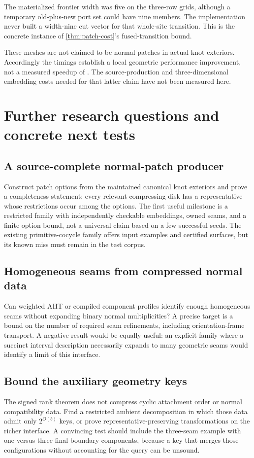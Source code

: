 \documentclass[11pt,letterpaper]{article}
\theoremstyle{definition}
\begin{document}
The materialized frontier width was five on the three-row grids, although a temporary old-plus-new port set could have nine members. The implementation never built a width-nine cut vector for that whole-site transition. This is the concrete instance of \cref{thm:patch-cost}'s fused-transition bound.

These meshes are not claimed to be normal patches in actual knot exteriors. Accordingly the timings establish a local geometric performance improvement, not a measured speedup of . The source-production and three-dimensional embedding costs needed for that latter claim have not been measured here.

\section{Further research questions and concrete next tests}
\label{sec:future}

\subsection{A source-complete normal-patch producer}
Construct patch options from the maintained canonical knot exteriors and prove a completeness statement: every relevant compressing disk has a representative whose restrictions occur among the options. The first useful milestone is a restricted family with independently checkable embeddings, owned seams, and a finite option bound, not a universal claim based on a few successful seeds. The existing primitive-cocycle family offers input examples and certified surfaces, but its known miss must remain in the test corpus.

\subsection{Homogeneous seams from compressed normal data}
Can weighted AHT or compiled component profiles identify enough homogeneous seams without expanding binary normal multiplicities? A precise target is a bound on the number of required seam refinements, including orientation-frame transport. A negative result would be equally useful: an explicit family where a succinct interval description necessarily expands to many geometric seams would identify a limit of this interface.

\subsection{Bound the auxiliary geometry keys}
The signed rank theorem does not compress cyclic attachment order or normal compatibility data. Find a restricted ambient decomposition in which those data admit only $2^{O(b)}$ keys, or prove representative-preserving transformations on the richer interface. A convincing test should include the three-seam example with one versus three final boundary components, because a key that merges those configurations without accounting for the query can be unsound.
\end{document}
